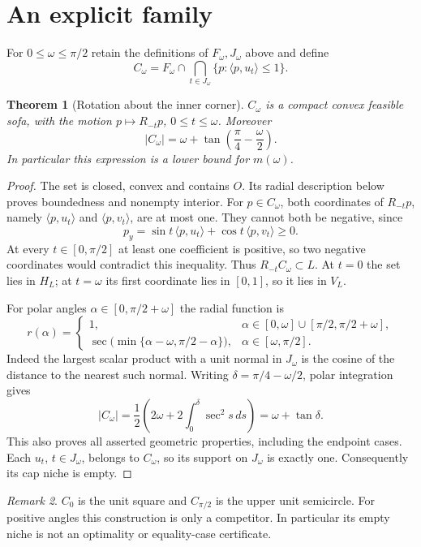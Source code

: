 \documentclass[11pt]{article}
\newtheorem{theorem}{Theorem}[section]
\theoremstyle{remark}\newtheorem{remark}[theorem]{Remark}
\newcommand{\area}[1]{\lvert #1\rvert}
\newcommand{\ip}[2]{\langle #1,#2\rangle}
\begin{document}
\section{An explicit family}
For $0\le\omega\le\pi/2$ retain the definitions of $F_\omega,J_\omega$ above and define
\[
 C_\omega=F_\omega\cap\bigcap_{t\in J_\omega}\{p:\ip p{u_t}\le1\}.
\]
\begin{theorem}[Rotation about the inner corner]\label{thm:competitor}
$C_\omega$ is a compact convex feasible sofa, with the motion $p\mapsto R_{-t}p$, $0\le t\le\omega$. Moreover
\[
 \area{C_\omega}=\omega+\tan\left(\frac\pi4-\frac\omega2\right).
\]
In particular this expression is a lower bound for $m(\omega)$.
\end{theorem}
\begin{proof}
The set is closed, convex and contains $O$. Its radial description below proves boundedness and nonempty interior. For $p\in C_\omega$, both coordinates of $R_{-t}p$, namely $\ip p{u_t}$ and $\ip p{v_t}$, are at most one. They cannot both be negative, since
\[
 p_y=\sin t\,\ip p{u_t}+\cos t\,\ip p{v_t}\ge0.
\]
At every $t\in[0,\pi/2]$ at least one coefficient is positive, so two negative coordinates would contradict this inequality. Thus $R_{-t}C_\omega\subset L$. At $t=0$ the set lies in $H_L$; at $t=\omega$ its first coordinate lies in $[0,1]$, so it lies in $V_L$.

For polar angles $\alpha\in[0,\pi/2+\omega]$ the radial function is
\[
 r(\alpha)=\begin{cases}
 1,&\alpha\in[0,\omega]\cup[\pi/2,\pi/2+\omega],\\
 \sec\!\bigl(\min\{\alpha-\omega,\pi/2-\alpha\}\bigr),&\alpha\in[\omega,\pi/2].
 \end{cases}
\]
Indeed the largest scalar product with a unit normal in $J_\omega$ is the cosine of the distance to the nearest such normal. Writing $\delta=\pi/4-\omega/2$, polar integration gives
\[
 \area{C_\omega}=\frac12\left(2\omega+2\int_0^\delta\sec^2 s\,ds\right)=\omega+\tan\delta.
\]
This also proves all asserted geometric properties, including the endpoint cases. Each $u_t$, $t\in J_\omega$, belongs to $C_\omega$, so its support on $J_\omega$ is exactly one. Consequently its cap niche is empty.
\end{proof}

\begin{remark}
$C_0$ is the unit square and $C_{\pi/2}$ is the upper unit semicircle. For positive angles this construction is only a competitor. In particular its empty niche is not an optimality or equality-case certificate.
\end{remark}
\end{document}

